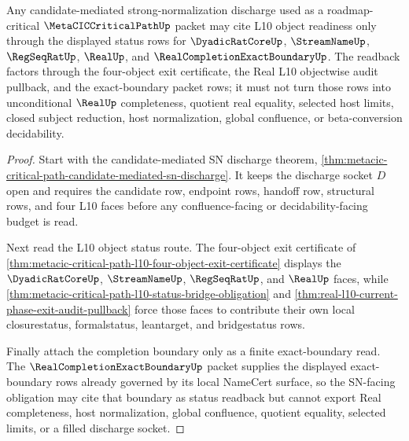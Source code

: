 \begin{theorem}
\label{thm:metacic-critical-path-l10-object-status-readback}
Any candidate-mediated strong-normalization discharge used as a roadmap-critical $\MetaCICCriticalPathUp$ packet may cite L10 object readiness only through the displayed status rows for $\DyadicRatCoreUp$, $\StreamNameUp$, $\RegSeqRatUp$, $\RealUp$, and $\RealCompletionExactBoundaryUp$. The readback factors through the four-object exit certificate, the Real L10 objectwise audit pullback, and the exact-boundary packet rows; it must not turn those rows into unconditional $\RealUp$ completeness, quotient real equality, selected host limits, closed subject reduction, host normalization, global confluence, or beta-conversion decidability.
\end{theorem}
\begin{proof}
Start with the candidate-mediated SN discharge theorem, \autoref{thm:metacic-critical-path-candidate-mediated-sn-discharge}. It keeps the discharge socket $D$ open and requires the candidate row, endpoint rows, handoff row, structural rows, and four L10 faces before any confluence-facing or decidability-facing budget is read.

Next read the L10 object status route. The four-object exit certificate of \autoref{thm:metacic-critical-path-l10-four-object-exit-certificate} displays the $\DyadicRatCoreUp$, $\StreamNameUp$, $\RegSeqRatUp$, and $\RealUp$ faces, while \autoref{thm:metacic-critical-path-l10-status-bridge-obligation} and \autoref{thm:real-l10-current-phase-exit-audit-pullback} force those faces to contribute their own local closurestatus, formalstatus, leantarget, and bridgestatus rows.

Finally attach the completion boundary only as a finite exact-boundary read. The $\RealCompletionExactBoundaryUp$ packet supplies the displayed exact-boundary rows already governed by its local NameCert surface, so the SN-facing obligation may cite that boundary as status readback but cannot export Real completeness, host normalization, global confluence, quotient equality, selected limits, or a filled discharge socket.
\end{proof}
